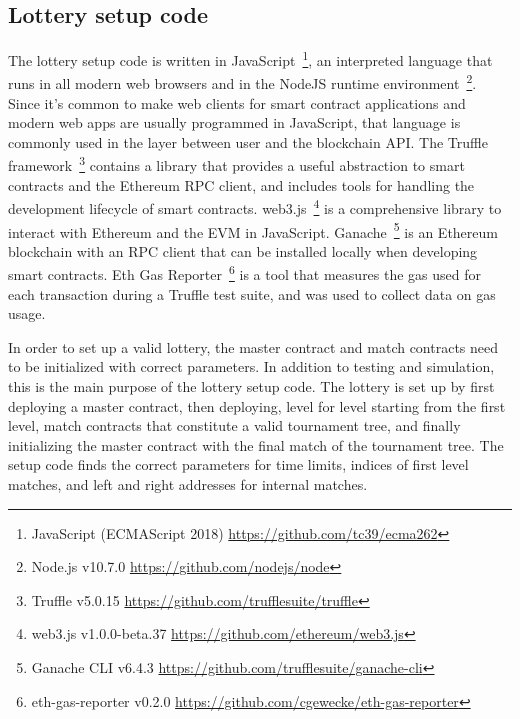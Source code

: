 


\subsection{Lottery setup code}
The lottery setup code is written in JavaScript~\footnote{JavaScript (ECMAScript 2018) \url{https://github.com/tc39/ecma262}}, an interpreted language that runs in all modern web browsers and in the NodeJS runtime environment~\footnote{Node.js v10.7.0 \url{https://github.com/nodejs/node}}. Since it's common to make web clients for smart contract applications and modern web apps are usually programmed in JavaScript, that language is commonly used in the layer between user and the blockchain API. The Truffle framework~\footnote{Truffle v5.0.15 \url{https://github.com/trufflesuite/truffle}} contains a library that provides a useful abstraction to smart contracts and the Ethereum RPC client, and includes tools for handling the development lifecycle of smart contracts. web3.js~\footnote{web3.js v1.0.0-beta.37 \url{https://github.com/ethereum/web3.js}} is a comprehensive library to interact with Ethereum and the EVM in JavaScript. Ganache~\footnote{Ganache CLI v6.4.3 \url{https://github.com/trufflesuite/ganache-cli}} is an Ethereum blockchain with an RPC client that can be installed locally when developing smart contracts. Eth Gas Reporter~\footnote{eth-gas-reporter v0.2.0 \url{https://github.com/cgewecke/eth-gas-reporter}} is a tool that measures the gas used for each transaction during a Truffle test suite, and was used to collect data on gas usage.

In order to set up a valid lottery, the master contract and match contracts need to be initialized with correct parameters. In addition to testing and simulation, this is the main purpose of the lottery setup code. The lottery is set up by first deploying a master contract, then deploying, level for level starting from the first level, match contracts that constitute a valid tournament tree, and finally initializing the master contract with the final match of the tournament tree. The setup code finds the correct parameters for time limits, indices of first level matches, and left and right addresses for internal matches. 

